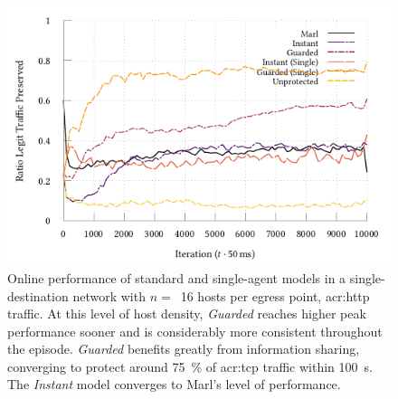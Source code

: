 \begin{figure}
	\centering
	\includegraphics[width=\linewidth]{plots/marl/tnsm-tcp-16-single-thesis}
	\caption[Online performance of standard and single-agent models in a single-destination network with $n=$~\num{16} hosts per egress point, HTTP traffic.]{
		Online performance of standard and single-agent models in a single-destination network with $n=$~\num{16} hosts per egress point, \gls{acr:http} traffic.
		At this level of host density, \emph{Guarded} reaches higher peak performance sooner and is considerably more consistent throughout the episode.
		\emph{Guarded} benefits greatly from information sharing, converging to protect around \qty{75}{\percent} of \gls{acr:tcp} traffic within \qty{100}{\second}.
		The \emph{Instant} model converges to Marl's level of performance.
		\label{fig:tcp-tree-16}
	}
\end{figure}

%	

%	

